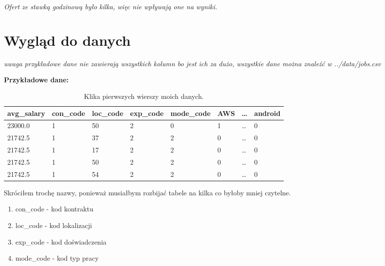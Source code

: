\documentclass[a4paper]{article}
\begin{document}
\begin{center}
    \textit{Ofert ze stawką godzinową było kilka, więc nie wpływają one na wyniki.}
\end{center}

\newpage

\section{Wygląd do danych}

\textit{uwaga przykładowe dane nie zawierają wszystkich kolumn bo jest ich za dużo, wszystkie dane można znaleźć w ../data/jobs.csv}


\textbf{Przykładowe dane:}

\begin{table}[H]
    \centering
    \begin{tabular}{|l|l|l|l|l|l|l|l|}
        \hline
        \textbf{avg\_salary} & \textbf{con\_code} & \textbf{loc\_code} & \textbf{exp\_code} & \textbf{mode\_code} & \textbf{AWS} & \dots & \textbf{android} \\ \hline
        23000.0              & 1                  & 50                 & 2                  & 0                   & 1            & \dots & 0                \\ \hline
        21742.5              & 1                  & 37                 & 2                  & 2                   & 0            & \dots & 0                \\ \hline
        21742.5              & 1                  & 17                 & 2                  & 2                   & 0            & \dots & 0                \\ \hline
        21742.5              & 1                  & 50                 & 2                  & 2                   & 0            & \dots & 0                \\ \hline
        21742.5              & 1                  & 54                 & 2                  & 2                   & 0            & \dots & 0                \\ \hline
    \end{tabular}
    \caption{Klika pierwszych wierszy moich danych.}
\end{table}



\begin{center}
    \begin{tcolorbox}[colback=white,colframe=blue, title=Uwaga]
        Skróciłem trochę nazwy, ponieważ musiałbym rozbijać tabele na kilka co byłoby mniej czytelne.
        \begin{enumerate}
            \raggedright
            \item con\_code - kod kontraktu
            \item loc\_code - kod lokalizacji
            \item exp\_code - kod doświadczenia
            \item mode\_code - kod typ pracy
        \end{enumerate}
    \end{tcolorbox}
\end{center}
\end{document}
